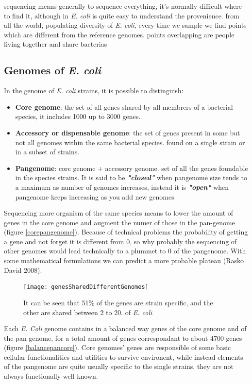 sequencing means generally to sequence everything, it's normally difficult where to find it, although in \emph{\emph{E. coli}} is quite easy to understand the provenience.
from all the world, populating diversity of \emph{\emph{E. coli}}, every time we sample we find points which are different from the reference genomes.
points overlapping are people living together and share bacterias


\subsection{Genomes of \emph{E. coli}}

In the genome of \emph{E. coli} strains, it is possible to distinguish:

\begin{itemize}
    \item \textbf{Core genome}: the set of all genes shared by all membrers of a bacterial species, it includes 1000 up to 3000 genes.
    \item \textbf{Accessory or dispensable genome}: the set of genes present in some but not all genomes within the same bacterial species. found on a single strain or in a subset of strains.
    \item \textbf{Pangenome}: core genome + accessory genome. set of all the genes foundable in the species strains. It is said to be \textit{\textbf{"closed"}} when pangenome size tends to a maximum as number of genomes increases, instead it is \textit{\textbf{"open"}} when pangenome keeps increasing as you add new genomes
\end{itemize}


Sequencing more organism of the same species means to lower the amount of genes in the core genome and augment the numer of those in the pan-genome (figure \ref{corepangenome}).
Because of technical problems the probability of getting a gene and not forget it is different from 0, so why probably the sequencing of other genomes would lead technically to a plummet to 0 of the pangenome. With some mathematical formulations we can predict a more probable plateau (Rasko David 2008).

\begin{figure}[h]
\caption{It can be seen that 51\% of the genes are strain specific, and the other are shared between 2 to 20.  of \emph{E. coli}}
\centering
\texttt{[image: genesSharedDifferentGenomes]}
\end{figure}

Each \emph{E. Coli} genome contains in a balanced way genes of the core genome and of the pan genome, for a total amount of genes correspondant to about 4700 genes (figure \ref{balancepancore}). Core genomes' genes are responsible of some basic cellular functionalities and utilities to survive environent, while instead elements of the pangenome are quite usually specific to the single strains, they are not always functionally well known.


